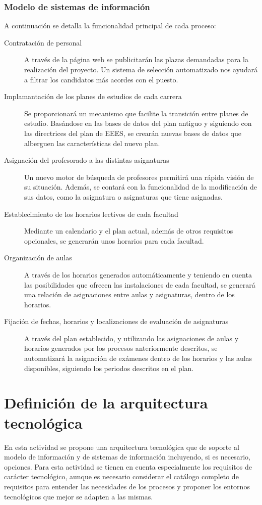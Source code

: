 \documentclass[11pt,a4paper,spanish,twoside]{book}
\begin{document}
\subsection{Modelo de sistemas de información} \label{ss:6.2.1}
A continuación se detalla la funcionalidad principal de cada proceso:

\begin{description}
\item[Contratación de personal] A través de la página web se publicitarán las
  plazas demandadas para la realización del proyecto. Un sistema de selección
  automatizado nos ayudará a filtrar los candidatos más acordes con el
  puesto. 
\item[Implamantación de los planes de estudios de cada carrera] Se
  proporcionará un mecanismo que facilite la transición entre planes de
  estudio. Basándose en las bases de datos del plan antiguo y siguiendo con
  las directrices del plan de EEES, se crearán nuevas bases de datos que
  alberguen las características del nuevo plan. 
\item[Asignación del profesorado a las distintas asignaturas] Un nuevo motor
  de búsqueda de profesores permitirá una rápida visión de su
  situación. Además, se contará con la funcionalidad de la modificación de
  sus datos, como la asignatura o asignaturas que tiene asignadas. 
\item[Establecimiento de los horarios lectivos de cada facultad] Mediante un
  calendario y el plan actual, además de otros requisitos opcionales, se
  generarán unos horarios para cada facultad. 
\item[Organización de aulas] A través de los horarios generados
  automáticamente y teniendo en cuenta las posibilidades que ofrecen las
  instalaciones de cada facultad, se generará una relación de asignaciones
  entre aulas y asignaturas, dentro de los horarios. 
\item[Fijación de fechas, horarios y localizaciones de evaluación de
  asignaturas] A través del plan establecido, y utilizando las asignaciones
  de aulas y horarios generados por los procesos anteriormente descritos, se
  automatizará la asignación de exámenes dentro de los horarios y las aulas
  disponibles, siguiendo los periodos descritos en el plan. 
\end{description}
 
\chapter{Definición de la arquitectura tecnológica}
En esta actividad se propone una arquitectura tecnológica que de soporte al
modelo de información y de sistemas de información incluyendo, si es
necesario, opciones. Para esta actividad se tienen en cuenta especialmente
los requisitos de carácter tecnológico, aunque es necesario considerar el
catálogo completo de requisitos para entender las necesidades de los procesos
y proponer los entornos tecnológicos que mejor se adapten a las mismas. 
\end{document}
